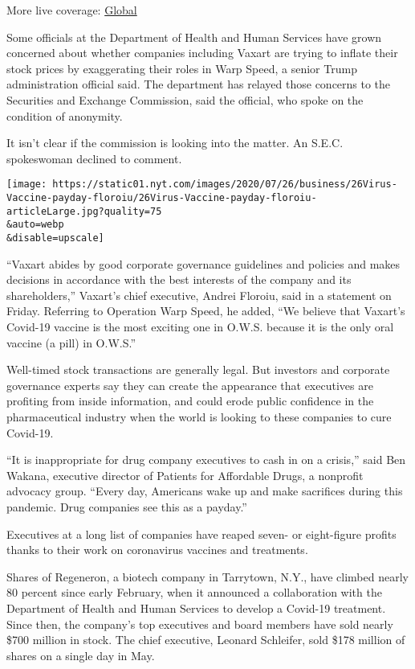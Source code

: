 More live coverage:
\href{https://www.nytimes.com/2020/08/03/world/coronavirus-covid-19.html?action=click\&pgtype=Article\&state=default\&region=MAIN_CONTENT_1\&context=storylines_live_updates}{Global}

Some officials at the Department of Health and Human Services have grown
concerned about whether companies including Vaxart are trying to inflate
their stock prices by exaggerating their roles in Warp Speed, a senior
Trump administration official said. The department has relayed those
concerns to the Securities and Exchange Commission, said the official,
who spoke on the condition of anonymity.

It isn't clear if the commission is looking into the matter. An S.E.C.
spokeswoman declined to comment.

\texttt{[image: https://static01.nyt.com/images/2020/07/26/business/26Virus-Vaccine-payday-floroiu/26Virus-Vaccine-payday-floroiu-articleLarge.jpg?quality=75\\\&auto=webp\\\&disable=upscale]}

``Vaxart abides by good corporate governance guidelines and policies and
makes decisions in accordance with the best interests of the company and
its shareholders,'' Vaxart's chief executive, Andrei Floroiu, said in a
statement on Friday. Referring to Operation Warp Speed, he added, ``We
believe that Vaxart's Covid-19 vaccine is the most exciting one in
O.W.S. because it is the only oral vaccine (a pill) in O.W.S.''

Well-timed stock transactions are generally legal. But investors and
corporate governance experts say they can create the appearance that
executives are profiting from inside information, and could erode public
confidence in the pharmaceutical industry when the world is looking to
these companies to cure Covid-19.

``It is inappropriate for drug company executives to cash in on a
crisis,'' said Ben Wakana, executive director of Patients for Affordable
Drugs, a nonprofit advocacy group. ``Every day, Americans wake up and
make sacrifices during this pandemic. Drug companies see this as a
payday.''

Executives at a long list of companies have reaped seven- or
eight-figure profits thanks to their work on coronavirus vaccines and
treatments.

Shares of Regeneron, a biotech company in Tarrytown, N.Y., have climbed
nearly 80 percent since early February, when it announced a
collaboration with the Department of Health and Human Services to
develop a Covid-19 treatment. Since then, the company's top executives
and board members have sold nearly \$700 million in stock. The chief
executive, Leonard Schleifer, sold \$178 million of shares on a single
day in May.

